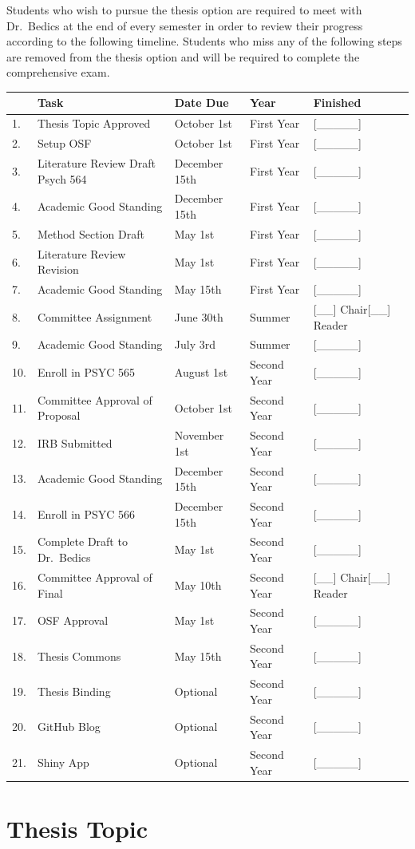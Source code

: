 \documentclass[openany]{book}
\begin{document}
Students who wish to pursue the thesis option are required to meet with Dr.~Bedics at the end of every semester in order to review their progress according to the following timeline.
Students who miss any of the following steps are removed from the thesis option and will be required to complete the comprehensive exam.

\begin{longtable}[]{@{}lllll@{}}
\toprule
& Task & Date Due & Year & Finished\tabularnewline
\midrule
\endhead
1. & Thesis Topic Approved & October 1st & First Year & {[}\_\_\_\_\_{]}\tabularnewline
2. & Setup OSF & October 1st & First Year & {[}\_\_\_\_\_{]}\tabularnewline
3. & Literature Review Draft Psych 564 & December 15th & First Year & {[}\_\_\_\_\_{]}\tabularnewline
4. & Academic Good Standing & December 15th & First Year & {[}\_\_\_\_\_{]}\tabularnewline
5. & Method Section Draft & May 1st & First Year & {[}\_\_\_\_\_{]}\tabularnewline
6. & Literature Review Revision & May 1st & First Year & {[}\_\_\_\_\_{]}\tabularnewline
7. & Academic Good Standing & May 15th & First Year & {[}\_\_\_\_\_{]}\tabularnewline
8. & Committee Assignment & June 30th & Summer & {[}\_\_{]} Chair{[}\_\_{]} Reader\tabularnewline
9. & Academic Good Standing & July 3rd & Summer & {[}\_\_\_\_\_{]}\tabularnewline
10. & Enroll in PSYC 565 & August 1st & Second Year & {[}\_\_\_\_\_{]}\tabularnewline
11. & Committee Approval of Proposal & October 1st & Second Year & {[}\_\_\_\_\_{]}\tabularnewline
12. & IRB Submitted & November 1st & Second Year & {[}\_\_\_\_\_{]}\tabularnewline
13. & Academic Good Standing & December 15th & Second Year & {[}\_\_\_\_\_{]}\tabularnewline
14. & Enroll in PSYC 566 & December 15th & Second Year & {[}\_\_\_\_\_{]}\tabularnewline
15. & Complete Draft to Dr.~Bedics & May 1st & Second Year & {[}\_\_\_\_\_{]}\tabularnewline
16. & Committee Approval of Final & May 10th & Second Year & {[}\_\_{]} Chair{[}\_\_{]} Reader\tabularnewline
17. & OSF Approval & May 1st & Second Year & {[}\_\_\_\_\_{]}\tabularnewline
18. & Thesis Commons & May 15th & Second Year & {[}\_\_\_\_\_{]}\tabularnewline
19. & Thesis Binding & Optional & Second Year & {[}\_\_\_\_\_{]}\tabularnewline
20. & GitHub Blog & Optional & Second Year & {[}\_\_\_\_\_{]}\tabularnewline
21. & Shiny App & Optional & Second Year & {[}\_\_\_\_\_{]}\tabularnewline
\bottomrule
\end{longtable}

\hypertarget{thesis-topic}{%
\section{Thesis Topic}\label{thesis-topic}}
\end{document}
